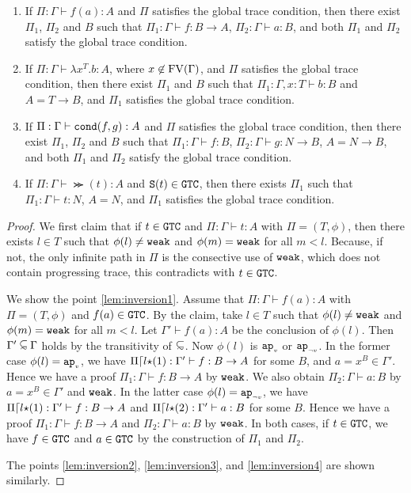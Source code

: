 \begin{lemma}\label{lem:inversion}
  \begin{enumerate}
  \item\label{lem:inversion1}
    If $\Pi:\Gamma\vdash f(a):A$ and $\Pi$ satisfies the global trace condition, then
    there exist $\Pi_1$, $\Pi_2$ and $B$ such that
    $\Pi_1:\Gamma\vdash f:B\to A$, $\Pi_2:\Gamma\vdash a:B$,
    and both $\Pi_1$ and $\Pi_2$ satisfy the global trace condition. 
  \item\label{lem:inversion2}
    If $\Pi:\Gamma\vdash \lambda x^T.b:A$, where $x\not\in{{\rm FV}}(\Gamma)$,
    and $\Pi$ satisfies the global trace condition, then
    there exist $\Pi_1$ and $B$ such that
    $\Pi_1:\Gamma,x:T\vdash b:B$ and $A = T\to B$,
    and $\Pi_1$ satisfies the global trace condition. 
  \item\label{lem:inversion3}
    If $\Pi:\Gamma\vdash {\tt cond}(f,g):A$ and $\Pi$ satisfies the global trace condition, then
    there exist $\Pi_1$, $\Pi_2$ and $B$ such that
    $\Pi_1:\Gamma \vdash f:B$, $\Pi_2:\Gamma \vdash g:N\to B$, $A = N\to B$,
    and both $\Pi_1$ and $\Pi_2$ satisfy the global trace condition. 
  \item\label{lem:inversion4}
    If $\Pi:\Gamma\vdash \Succ(t):A$ and ${\tt S}(t) \in {\tt GTC}$, then    
    there exists $\Pi_1$ such that $\Pi_1:\Gamma \vdash t:N$, $A=N$, 
    and $\Pi_1$ satisfies the global trace condition. 
  \end{enumerate}
\end{lemma}
\begin{proof}
  We first claim that if $t\in{\tt GTC}$ and $\Pi:\Gamma\vdash t:A$ with $\Pi=(T,\phi)$, 
  then there exists $l\in T$ such that $\phi(l) \neq {\tt weak}$ and $\phi(m) = {\tt weak}$ for all $m < l$.
  Because, if not, the only infinite path in $\Pi$ is the consective use of ${\tt weak}$,
  which does not contain progressing trace, this contradicts with $t\in{\tt GTC}$.

  We show the point \ref{lem:inversion1}.
  Assume that $\Pi:\Gamma\vdash f(a):A$ with $\Pi=(T,\phi)$ and $f(a) \in {\tt GTC}$.
  By the claim, take $l\in T$ such that $\phi(l) \neq {\tt weak}$ and $\phi(m) = {\tt weak}$ for all $m < l$.
  Let $\Gamma' \vdash f(a):A$ be the conclusion of $\phi(l)$. Then $\Gamma'\subseteqsim \Gamma$ holds
  by the transitivity of $\subseteqsim$.
  Now $\phi(l)$ is ${{\tt ap}_{\mbox{\tiny $v$}}}$ or ${{\tt ap}_{\mbox{\tiny $\neg v$}}}$.
  In the former case $\phi(l) = {{\tt ap}_{\mbox{\tiny $v$}}}$, we have $\Pi{\lceil} l{\star}(1):\Gamma'\vdash f:B\to A$ for some $B$,
  and $a = x^B \in \Gamma'$. Hence we have a proof $\Pi_1:\Gamma\vdash f:B\to A$ by ${\tt weak}$. 
  We also obtain $\Pi_2:\Gamma\vdash a:B$ by $a = x^B \in \Gamma'$ and ${\tt weak}$. 
  In the latter case $\phi(l) = {{\tt ap}_{\mbox{\tiny $\neg v$}}}$,
  we have $\Pi{\lceil} l{\star}(1):\Gamma'\vdash f:B\to A$ and $\Pi{\lceil} l{\star}(2):\Gamma'\vdash a:B$ for some $B$. 
  Hence we have a proof $\Pi_1:\Gamma\vdash f:B\to A$ and $\Pi_2:\Gamma\vdash a:B$ by ${\tt weak}$.
  In both cases, if $t\in{\tt GTC}$, we have $f\in{\tt GTC}$ and $a\in{\tt GTC}$ by the construction of $\Pi_1$ and $\Pi_2$. 
  
  The points \ref{lem:inversion2}, \ref{lem:inversion3}, and \ref{lem:inversion4} are shown similarly. 
\end{proof}


